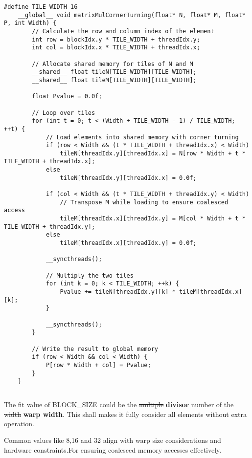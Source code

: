 \documentclass{article}
\begin{document}
\begin{lstlisting}[basicstyle=\small\ttfamily, breaklines=true]
    #define TILE_WIDTH 16
    __global__ void matrixMulCornerTurning(float* N, float* M, float* P, int Width) {
        // Calculate the row and column index of the element
        int row = blockIdx.y * TILE_WIDTH + threadIdx.y;
        int col = blockIdx.x * TILE_WIDTH + threadIdx.x;

        // Allocate shared memory for tiles of N and M
        __shared__ float tileN[TILE_WIDTH][TILE_WIDTH];
        __shared__ float tileM[TILE_WIDTH][TILE_WIDTH];

        float Pvalue = 0.0f;

        // Loop over tiles
        for (int t = 0; t < (Width + TILE_WIDTH - 1) / TILE_WIDTH; ++t) {
            // Load elements into shared memory with corner turning
            if (row < Width && (t * TILE_WIDTH + threadIdx.x) < Width)
                tileN[threadIdx.y][threadIdx.x] = N[row * Width + t * TILE_WIDTH + threadIdx.x];
            else
                tileN[threadIdx.y][threadIdx.x] = 0.0f;

            if (col < Width && (t * TILE_WIDTH + threadIdx.y) < Width)
                // Transpose M while loading to ensure coalesced access
                tileM[threadIdx.x][threadIdx.y] = M[col * Width + t * TILE_WIDTH + threadIdx.y];
            else
                tileM[threadIdx.x][threadIdx.y] = 0.0f;

            __syncthreads();

            // Multiply the two tiles
            for (int k = 0; k < TILE_WIDTH; ++k) {
                Pvalue += tileN[threadIdx.y][k] * tileM[threadIdx.x][k];
            }

            __syncthreads();
        }

        // Write the result to global memory
        if (row < Width && col < Width) {
            P[row * Width + col] = Pvalue;
        }
    }
\end{lstlisting}

\subsection{}
The fit value of BLOCK\_SIZE could be the \sout{multiple} \textbf{divisor} number of the \sout{width} \textbf{warp width}. This shall makes it fully consider all elements without extra operation.

Common values like 8,16 and 32 align with warp size considerations and hardware constraints.For ensuring coalesced memory accesses effectively.
\end{document}
